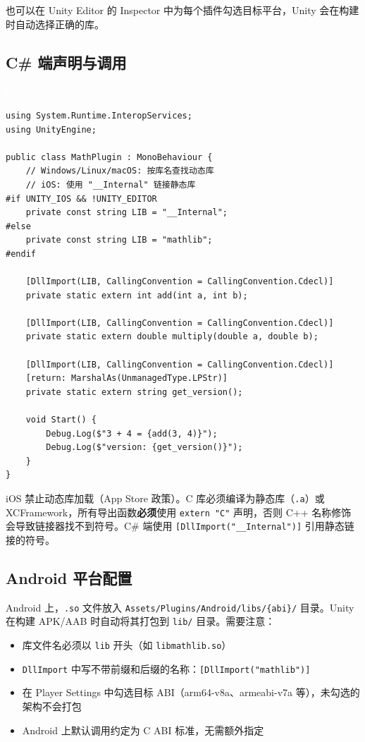 \documentclass[12pt,a4paper,fontset=fandol]{ctexbook}
\newcommand{\csharplabel}{%
  \begin{tcolorbox}[enhanced,colback=csharpheadbg,colframe=csharpheadbg,
    arc=1mm,boxrule=0mm,left=6pt,right=6pt,top=2pt,bottom=2pt,
    halign=left,oversize]
    \textcolor{white}{\small\bfseries C\#}
  \end{tcolorbox}\vspace{-4pt}}
\newcommand{\cpp}[1]{C++#1}
\newcommand{\Tp}[1]{\texttt{#1}}
\begin{document}
也可以在 Unity Editor 的 Inspector 中为每个插件勾选目标平台，Unity 会在构建时自动选择正确的库。

\subsection{C\# 端声明与调用}

\csharplabel
\begin{lstlisting}[style=csharpstyle]
using System.Runtime.InteropServices;
using UnityEngine;

public class MathPlugin : MonoBehaviour {
    // Windows/Linux/macOS: 按库名查找动态库
    // iOS: 使用 "__Internal" 链接静态库
#if UNITY_IOS && !UNITY_EDITOR
    private const string LIB = "__Internal";
#else
    private const string LIB = "mathlib";
#endif

    [DllImport(LIB, CallingConvention = CallingConvention.Cdecl)]
    private static extern int add(int a, int b);

    [DllImport(LIB, CallingConvention = CallingConvention.Cdecl)]
    private static extern double multiply(double a, double b);

    [DllImport(LIB, CallingConvention = CallingConvention.Cdecl)]
    [return: MarshalAs(UnmanagedType.LPStr)]
    private static extern string get_version();

    void Start() {
        Debug.Log($"3 + 4 = {add(3, 4)}");
        Debug.Log($"version: {get_version()}");
    }
}
\end{lstlisting}

\begin{tcolorbox}[warning={iOS 必须使用 extern "C" 和静态库}]
iOS 禁止动态库加载（App Store 政策）。C 库必须编译为静态库（\texttt{.a}）或 XCFramework，所有导出函数\textbf{必须}使用 \texttt{extern "C"} 声明，否则 \cpp{} 名称修饰会导致链接器找不到符号。C\# 端使用 \texttt{[DllImport("\_\_Internal")]} 引用静态链接的符号。
\end{tcolorbox}

\subsection{Android 平台配置}

Android 上，\texttt{.so} 文件放入 \texttt{Assets/Plugins/Android/libs/\{abi\}/} 目录。Unity 在构建 APK/AAB 时自动将其打包到 \texttt{lib/} 目录。需要注意：

\begin{itemize}[nosep]
\item 库文件名必须以 \texttt{lib} 开头（如 \texttt{libmathlib.so}）
\item \Tp{DllImport} 中写不带前缀和后缀的名称：\texttt{[DllImport("mathlib")]}
\item 在 Player Settings 中勾选目标 ABI（arm64-v8a、armeabi-v7a 等），未勾选的架构不会打包
\item Android 上默认调用约定为 C ABI 标准，无需额外指定
\end{itemize}
\end{document}
